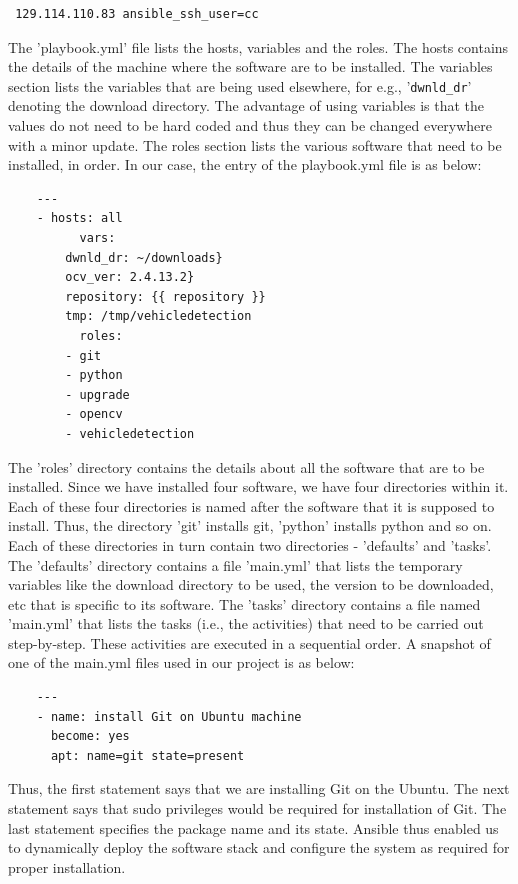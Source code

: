 \documentclass[9pt,twocolumn,twoside]{../../styles/osajnl}
\begin{document}
\begin{lstlisting}
 129.114.110.83 ansible_ssh_user=cc
\end{lstlisting}  
	
The 'playbook.yml' file lists the hosts, variables and the roles.  The
hosts contains the details of the machine where the software are to
be installed.  The variables section lists the variables that are
being used elsewhere, for e.g., '\texttt{dwnld\_dr}' denoting the download
directory.  The advantage of using variables is that the values do not
need to be hard coded and thus they can be changed everywhere with a
minor update.  The roles section lists the various software that need
to be installed, in order.  In our case, the entry of the playbook.yml
file is as below:

\begin{lstlisting}
	---
	- hosts: all
          vars:
	    dwnld_dr: ~/downloads}
	    ocv_ver: 2.4.13.2}
	    repository: {{ repository }}
	    tmp: /tmp/vehicledetection
          roles:
	    - git
	    - python
	    - upgrade
	    - opencv
	    - vehicledetection
\end{lstlisting}
                
The 'roles' directory contains the details about all the software
that are to be installed.  Since we have installed four software, we
have four directories within it.  Each of these four directories is
named after the software that it is supposed to install.  Thus, the
directory 'git' installs git, 'python' installs python and so on.
Each of these directories in turn contain two directories - 'defaults'
and 'tasks'.  The 'defaults' directory contains a file 'main.yml' that
lists the temporary variables like the download directory to be used,
the version to be downloaded, etc that is specific to its software.
The 'tasks' directory contains a file named 'main.yml' that lists the
tasks (i.e., the activities) that need to be carried out step-by-step.
These activities are executed in a sequential order.  A snapshot of
one of the main.yml files used in our project is as below:

\begin{lstlisting}
	---
	- name: install Git on Ubuntu machine
	  become: yes
	  apt: name=git state=present
\end{lstlisting}

Thus, the first statement says that we are installing Git on the
Ubuntu.  The next statement says that sudo privileges would be
required for installation of Git.  The last statement specifies the
package name and its state.  Ansible thus enabled us to dynamically
deploy the software stack and configure the system as required for
proper installation.
\end{document}
